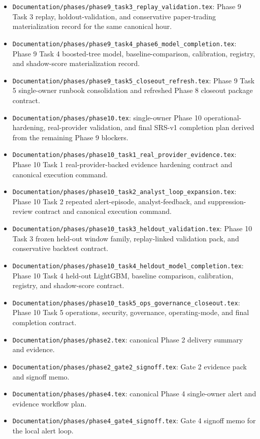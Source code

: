 \documentclass{article}
\begin{document}
\begin{itemize}
\item \texttt{Documentation/phases/phase9\_task3\_replay\_validation.tex}: Phase 9 Task 3 replay, holdout-validation, and conservative paper-trading materialization record for the same canonical hour.
\item \texttt{Documentation/phases/phase9\_task4\_phase6\_model\_completion.tex}: Phase 9 Task 4 boosted-tree model, baseline-comparison, calibration, registry, and shadow-score materialization record.
\item \texttt{Documentation/phases/phase9\_task5\_closeout\_refresh.tex}: Phase 9 Task 5 single-owner runbook consolidation and refreshed Phase 8 closeout package contract.
\item \texttt{Documentation/phases/phase10.tex}: single-owner Phase 10 operational-hardening, real-provider validation, and final SRS-v1 completion plan derived from the remaining Phase 9 blockers.
\item \texttt{Documentation/phases/phase10\_task1\_real\_provider\_evidence.tex}: Phase 10 Task 1 real-provider-backed evidence hardening contract and canonical execution command.
\item \texttt{Documentation/phases/phase10\_task2\_analyst\_loop\_expansion.tex}: Phase 10 Task 2 repeated alert-episode, analyst-feedback, and suppression-review contract and canonical execution command.
\item \texttt{Documentation/phases/phase10\_task3\_heldout\_validation.tex}: Phase 10 Task 3 frozen held-out window family, replay-linked validation pack, and conservative backtest contract.
\item \texttt{Documentation/phases/phase10\_task4\_heldout\_model\_completion.tex}: Phase 10 Task 4 held-out LightGBM, baseline comparison, calibration, registry, and shadow-score contract.
\item \texttt{Documentation/phases/phase10\_task5\_ops\_governance\_closeout.tex}: Phase 10 Task 5 operations, security, governance, operating-mode, and final completion contract.
\item \texttt{Documentation/phases/phase2.tex}: canonical Phase 2 delivery summary and evidence.
\item \texttt{Documentation/phases/phase2\_gate2\_signoff.tex}: Gate 2 evidence pack and signoff memo.
\item \texttt{Documentation/phases/phase4.tex}: canonical Phase 4 single-owner alert and evidence workflow plan.
\item \texttt{Documentation/phases/phase4\_gate4\_signoff.tex}: Gate 4 signoff memo for the local alert loop.

\end{itemize}
\end{document}
